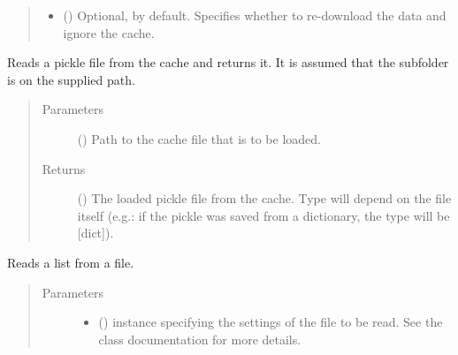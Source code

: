 \documentclass[letterpaper,10pt,english]{sphinxmanual}
\begin{document}
\begin{fulllineitems}
\begin{fulllineitems}
\begin{quote}
\begin{description}
\begin{itemize}
\item {} 
 () \textendash{} Optional,  by default. Specifies whether to
re-download the data and ignore the cache.

\end{itemize}

\end{description}\end{quote}

\end{fulllineitems}


\begin{fulllineitems}
\label{\detokenize{main:pypath.main.PyPath.read_from_cache}}
Reads a pickle file from the cache and returns it. It is assumed
that the subfolder  is on the supplied path.
\begin{quote}\begin{description}
\item[{Parameters}] \leavevmode
{} () \textendash{} Path to the cache file that is to be loaded.

\item[{Returns}] \leavevmode
() \textendash{} The loaded pickle file from the cache. Type will
depend on the file itself (e.g.: if the pickle was saved
from a dictionary, the type will be {[}dict{]}).

\end{description}\end{quote}

\end{fulllineitems}


\begin{fulllineitems}
\label{\detokenize{main:pypath.main.PyPath.read_list_file}}
Reads a list from a file.
\begin{quote}\begin{description}
\item[{Parameters}] \leavevmode\begin{itemize}
\item {} 
 () \textendash{}  instance specifying
the settings of the file to be read. See the class
documentation for more details.


\end{itemize}
\end{description}
\end{quote}
\end{fulllineitems}
\end{fulllineitems}
\end{document}
